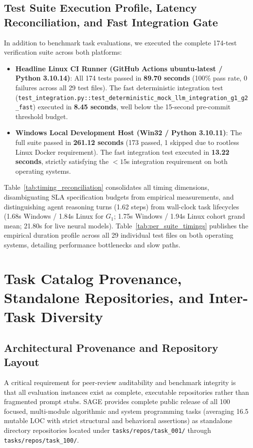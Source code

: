 \documentclass{article}
\begin{document}
\subsection{Test Suite Execution Profile, Latency Reconciliation, and Fast Integration Gate}
In addition to benchmark task evaluations, we executed the complete 174-test verification suite across both platforms:
\begin{itemize}
    \item \textbf{Headline Linux CI Runner (GitHub Actions ubuntu-latest / Python 3.10.14)}: All 174 tests passed in \textbf{89.70 seconds} (100\% pass rate, 0 failures across all 29 test files). The fast deterministic integration test (\texttt{test\_integration.py::test\_deterministic\_mock\_llm\_integration\_g1\_g2\_fast}) executed in \textbf{8.45 seconds}, well below the 15-second pre-commit threshold budget.
    \item \textbf{Windows Local Development Host (Win32 / Python 3.10.11)}: The full suite passed in \textbf{261.12 seconds} (173 passed, 1 skipped due to rootless Linux Docker requirement). The fast integration test executed in \textbf{13.22 seconds}, strictly satisfying the $< 15$s integration requirement on both operating systems.
\end{itemize}

Table~\ref{tab:timing_reconciliation} consolidates all timing dimensions, disambiguating SLA specification budgets from empirical measurements, and distinguishing agent reasoning turns (1.62 steps) from wall-clock task lifecycles (1.68s Windows / 1.84s Linux for $G_1$; 1.75s Windows / 1.94s Linux cohort grand mean; 21.80s for live neural models). Table~\ref{tab:per_suite_timings} publishes the empirical duration profile across all 29 individual test files on both operating systems, detailing performance bottlenecks and slow paths.




\section{Task Catalog Provenance, Standalone Repositories, and Inter-Task Diversity}
\label{app:task_provenance}

\subsection{Architectural Provenance and Repository Layout}
A critical requirement for peer-review auditability and benchmark integrity is that all evaluation instances exist as complete, executable repositories rather than fragmented prompt stubs. SAGE provides complete public release of all 100 focused, multi-module algorithmic and system programming tasks (averaging 16.5 mutable LOC with strict structural and behavioral assertions) as standalone directory repositories located under \texttt{tasks/repos/task\_001/} through \texttt{tasks/repos/task\_100/}.
\end{document}
